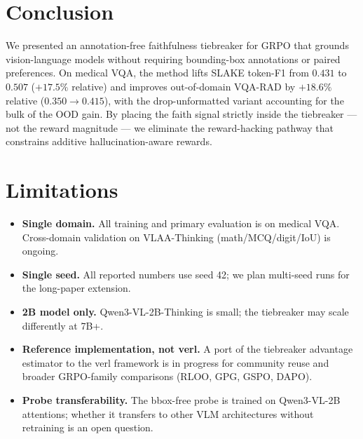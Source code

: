 \documentclass[11pt]{article}
\begin{document}
\section{Conclusion}

We presented an annotation-free faithfulness tiebreaker for GRPO that
grounds vision-language models without requiring bounding-box
annotations or paired preferences. On medical VQA, the method lifts
SLAKE token-F1 from $0.431$ to $0.507$ ($+17.5\%$ relative) and
improves out-of-domain VQA-RAD by $+18.6\%$ relative ($0.350 \rightarrow
0.415$), with the drop-unformatted variant
accounting for the bulk of the OOD gain. By placing the faith signal
strictly inside the tiebreaker --- not the reward magnitude --- we
eliminate the reward-hacking pathway that constrains additive
hallucination-aware rewards.

\section*{Limitations}

\begin{itemize}
\itemsep0em
\item \textbf{Single domain.} All training and primary evaluation is on
  medical VQA. Cross-domain validation on VLAA-Thinking
  (math/MCQ/digit/IoU) is ongoing.
\item \textbf{Single seed.} All reported numbers use seed 42; we plan
  multi-seed runs for the long-paper extension.
\item \textbf{2B model only.} Qwen3-VL-2B-Thinking is small; the
  tiebreaker may scale differently at 7B+.
\item \textbf{Reference implementation, not verl.} A port of the
  tiebreaker advantage estimator to the verl framework is in progress
  for community reuse and broader GRPO-family comparisons (RLOO, GPG,
  GSPO, DAPO).
\item \textbf{Probe transferability.} The bbox-free probe is trained on
  Qwen3-VL-2B attentions; whether it transfers to other VLM
  architectures without retraining is an open question.
\end{itemize}



\end{document}
